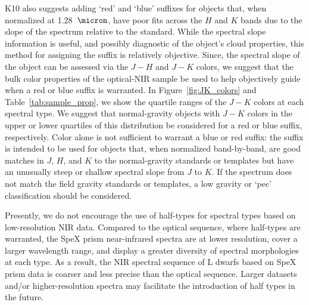 \documentclass[12pt,preprint]{aastex}
\begin{document}
K10 also suggests adding `red' and `blue' suffixes for objects that, when normalized at 1.28~$\micron$, have poor fits across the $H$ and $K$ bands due to the slope of the spectrum relative to the standard. 
While the spectral slope information is useful, and possibly diagnostic of the object's cloud properties, this method for assigning the suffix is relatively objective.
Since, the spectral slope of the object can be assessed via the $J-H$ and $J-K$ colors, we suggest that the bulk color properties of the optical-NIR sample be used to help objectively guide when a red or blue suffix is warranted.
In Figure~\ref{fig:JK_colors} and Table~\ref{tab:sample_prop}, we show the quartile ranges of the $J-K$ colors at each spectral type. 
We suggest that normal-gravity objects with $J-K$ colors in the upper or lower quartiles of this distribution be considered for a red or blue suffix, respectively. 
Color alone is not sufficient to warrant a blue or red suffix: the suffix is intended to be used for objects that, when normalized band-by-band, are good matches in $J$, $H$, and $K$ to the normal-gravity standards or templates but have an unusually steep or shallow spectral slope from $J$ to $K$.
If the spectrum does not match the field gravity standards or templates, a low gravity or `pec' classification should be considered.

Presently, we do not encourage the use of half-types for spectral types based on low-resolution NIR data. 
Compared to the optical sequence, where half-types are warranted, the SpeX prism near-infrared spectra are at lower resolution, cover a larger wavelength range, and display a greater diversity of spectral morphologies at each type. 
As a result, the NIR spectral sequence of L dwarfs based on SpeX prism data is coarser and less precise than the optical sequence.
Larger datasets and/or higher-resolution spectra may facilitate the introduction of half types in the future.

\end{document}
